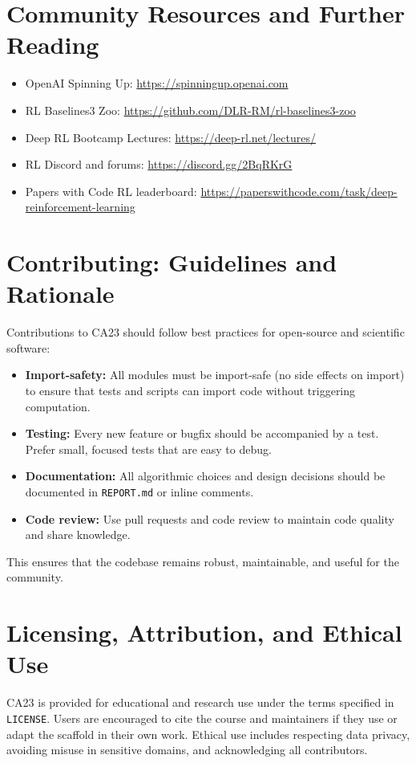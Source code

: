 \documentclass[11pt]{article}
\begin{document}
\section{Community Resources and Further Reading}
\begin{itemize}
  \item OpenAI Spinning Up: \url{https://spinningup.openai.com}
  \item RL Baselines3 Zoo: \url{https://github.com/DLR-RM/rl-baselines3-zoo}
  \item Deep RL Bootcamp Lectures: \url{https://deep-rl.net/lectures/}
  \item RL Discord and forums: \url{https://discord.gg/2BqRKrG}
  \item Papers with Code RL leaderboard: \url{https://paperswithcode.com/task/deep-reinforcement-learning}
\end{itemize}

\section{Contributing: Guidelines and Rationale}
Contributions to CA23 should follow best practices for open-source and scientific software:
\begin{itemize}
  \item \textbf{Import-safety:} All modules must be import-safe (no side effects on import) to ensure that tests and scripts can import code without triggering computation.
  \item \textbf{Testing:} Every new feature or bugfix should be accompanied by a test. Prefer small, focused tests that are easy to debug.
  \item \textbf{Documentation:} All algorithmic choices and design decisions should be documented in \texttt{REPORT.md} or inline comments.
  \item \textbf{Code review:} Use pull requests and code review to maintain code quality and share knowledge.
\end{itemize}
This ensures that the codebase remains robust, maintainable, and useful for the community.

\section{Licensing, Attribution, and Ethical Use}
CA23 is provided for educational and research use under the terms specified in \texttt{LICENSE}. Users are encouraged to cite the course and maintainers if they use or adapt the scaffold in their own work. Ethical use includes respecting data privacy, avoiding misuse in sensitive domains, and acknowledging all contributors.
\end{document}
